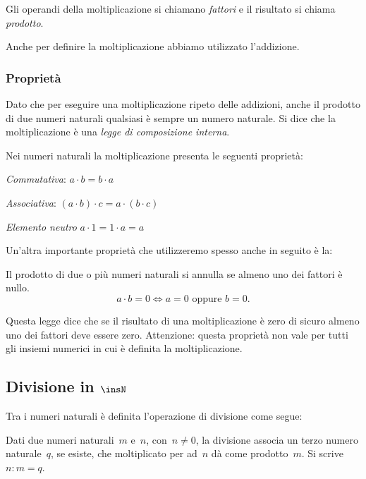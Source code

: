 Gli operandi della moltiplicazione si chiamano \emph{fattori} e il 
risultato si chiama \emph{prodotto}.

\osservazione Anche per definire la moltiplicazione abbiamo utilizzato 
l'addizione.

\subsubsection{Proprietà}

Dato che per eseguire una moltiplicazione ripeto delle addizioni, 
anche il prodotto di due numeri  naturali qualsiasi è sempre un numero 
naturale. 
Si dice che la moltiplicazione è una \emph{legge di composizione interna}. 

Nei numeri naturali la moltiplicazione presenta le seguenti proprietà:

\begin{itemize*}
 \item \emph{Commutativa}: $a \cdot b = b \cdot a$
 \item \emph{Associativa}: $(a \cdot b) \cdot c = a \cdot (b \cdot c)$
 \item \emph{Elemento neutro} $a \cdot 1 = 1 \cdot a = a$
\end{itemize*}

Un'altra importante proprietà che utilizzeremo spesso anche in seguito è la:

\begin{legge}
 Il prodotto di due o più numeri naturali si annulla se almeno uno dei 
fattori è nullo.
\[ a\cdot b=0\Leftrightarrow a=0\text{ oppure }b=0. \]
\end{legge}

Questa legge dice che se il risultato di una moltiplicazione è zero di 
sicuro almeno uno dei fattori deve essere zero. Attenzione: questa proprietà 
non vale per tutti gli insiemi numerici in cui è definita la 
moltiplicazione.

\subsection{Divisione in $\insN$}

Tra i numeri naturali è definita l'operazione di divisione come segue:

\begin{definizione}
Dati due numeri naturali~$m$ e~$n$, con~$n \neq 0$, la divisione associa 
un terzo numero naturale~$q$, se esiste, che moltiplicato per ad~$n$ dà 
come prodotto~$m$.
Si scrive~$n : m = q$.
\end{definizione}

